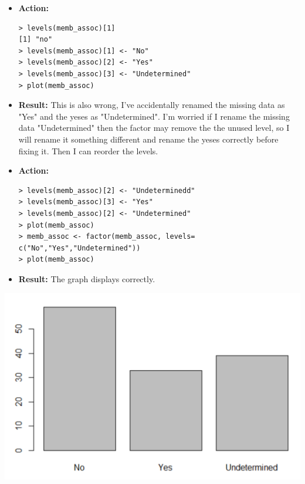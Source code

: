 \documentclass[12pt]{article}
\begin{document}
\begin{addmargin}[1cm]{0cm}
{\begin{itemize}
\begin{verbatim}
[1] undetermined
Levels: no undetermined yes
      \end{verbatim}\vspace{-2em} I realise that pulling [1] from the factor is actually giving me the first result, not the label of the first level. I need to rename the first level, not the results.
      \item \textbf{Action:} \vspace{-1em}\begin{verbatim}
> levels(memb_assoc)[1]
[1] "no"
> levels(memb_assoc)[1] <- "No"
> levels(memb_assoc)[2] <- "Yes"
> levels(memb_assoc)[3] <- "Undetermined"
> plot(memb_assoc)
      \end{verbatim}\vspace{-2em}
    \item \textbf{Result:} This is also wrong, I've accidentally renamed the missing data as "Yes" and the yeses as "Undetermined". I'm worried if I rename the missing data "Undetermined" then the factor may remove the the unused level, so I will rename it something different and rename the yeses correctly before fixing it. Then I can reorder the levels.
      \item \textbf{Action:} \vspace{-1em}\begin{verbatim}
> levels(memb_assoc)[2] <- "Undeterminedd"
> levels(memb_assoc)[3] <- "Yes"
> levels(memb_assoc)[2] <- "Undetermined"
> plot(memb_assoc)
> memb_assoc <- factor(memb_assoc, levels= c("No","Yes","Undetermined"))
> plot(memb_assoc)
      \end{verbatim}\vspace{-2em}
      \item\textbf{Result:} The graph displays correctly. 
\end{itemize}}      
\end{addmargin}
\centering\includegraphics[scale=0.8]{imgdcrplot.PNG}
\end{document}
